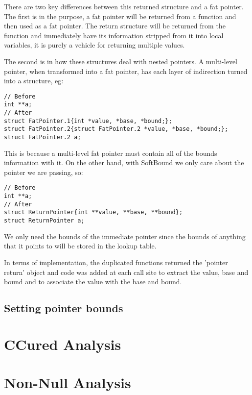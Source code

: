 There are two key differences between this returned structure and a fat pointer.
The first is in the purpose, a fat pointer will be returned from a function and then used as a fat pointer.
The return structure will be returned from the function and immediately have its information stripped from it into local variables, it is purely a vehicle for returning multiple values.

The second is in how these structures deal with nested pointers.
A multi-level pointer, when transformed into a fat pointer, has each layer of indirection turned into a structure, eg:

\begin{verbatim}
// Before
int **a;
// After
struct FatPointer.1{int *value, *base, *bound;};
struct FatPointer.2{struct FatPointer.2 *value, *base, *bound;};
struct FatPointer.2 a;
\end{verbatim}

This is because a multi-level fat pointer must contain all of the bounds information with it.
On the other hand, with SoftBound we only care about the pointer we are passing, so:

\begin{verbatim}
// Before
int **a;
// After
struct ReturnPointer{int **value, **base, **bound};
struct ReturnPointer a;
\end{verbatim}

We only need the bounds of the immediate pointer since the bounds of anything that it points to will be stored in the lookup table.

In terms of implementation, the duplicated functions returned the 'pointer return' object and code was added at each call site to extract the value, base and bound and to associate the value with the base and bound.

\subsection{Setting pointer bounds}

\section{CCured Analysis}

\section{Non-Null Analysis}
